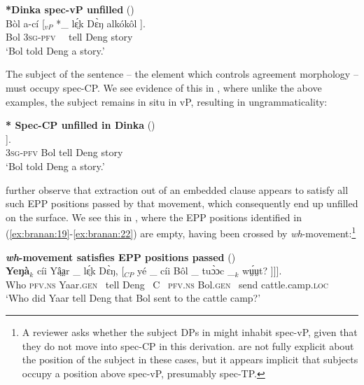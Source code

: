 \documentclass[output=paper,colorlinks,citecolor=brown]{langscibook}
\begin{document}
\ea%
    \label{ex:branan:21}
    \textbf{*Dinka spec-vP unfilled} \hfill{(\citealt[ex. 33c]{VanUrkRichards2015})}\\
    \gll    B\`{o}l a-c\'{i} [$_{vP}$ *\_ lɛ̤́k  D\`{ɛ}ŋ alk\'{o}k\^{o}l ].  \\
            Bol \textsc{3sg-pfv} \, \,  tell Deng story \\
    \glt    `Bol told Deng a story.'
\z

The subject of the sentence -- the element which controls agreement morphology -- must occupy spec-CP. We see evidence of this in , where unlike the above examples, the subject remains in situ in vP, resulting in ungrammaticality:

\ea%
    \label{ex:branan:22}
    \textbf{* Spec-CP unfilled in Dinka} \hfill{(\citealt[ex. 33d]{VanUrkRichards2015})}\\
    \gll    *[$_{CP}$ \_  a-c\'{i}i  [$_{vP}$ B\`{o}l   lɛ̤́k  D\`{ɛ}ŋ alk\'{o}k\^{o}l ] ]. \\
            {} {} \textsc{3sg-pfv} {}  Bol tell Deng story \\
    \glt    `Bol told Deng a story.'
\z

\citeauthor{VanUrkRichards2015} further observe that extraction out of an embedded clause appears to satisfy all such EPP positions passed by that movement, which consequently end up unfilled on the surface. We see this in , where the EPP positions identified in (\ref{ex:branan:19}-\ref{ex:branan:22}) are empty, having been crossed by \textit{wh}-movement:\footnote{A reviewer asks whether the subject DPs in  might inhabit spec-vP, given that they do not move into spec-CP in this derivation. \citeauthor{VanUrkRichards2015} are not fully explicit about the position of the subject in these cases, but it appears implicit that subjects occupy a position above spec-vP, presumably spec-TP.}

\ea%
    \label{ex:branan:23}
    \textbf{\textit{wh}-movement satisfies EPP positions passed}
    \hfill{(\citealt[ex. 37]{VanUrkRichards2015})}\\
    \gll    \textbf{Yeŋ\`{a}}$_{k}$ c\'{i}i  Yâ̤a̤r \_ lɛ̤́k  D\`{ɛ}ŋ, [$_{CP}$ y\'{e} \_  c\'{i}i  B\^{o}l \_ tu\`{ɔ}ɔc \_$_{k}$ wṳ́ṳt?  ]]]. \\
            Who \textsc{pfv.ns}   Yaar.\textsc{gen} \,  tell Deng \, C \, \textsc{pfv.ns}  Bol.\textsc{gen} \, send {} cattle.camp.\textsc{loc}  \\
    \glt    `Who did Yaar tell Deng that Bol sent to the cattle camp?'
\z
\end{document}
